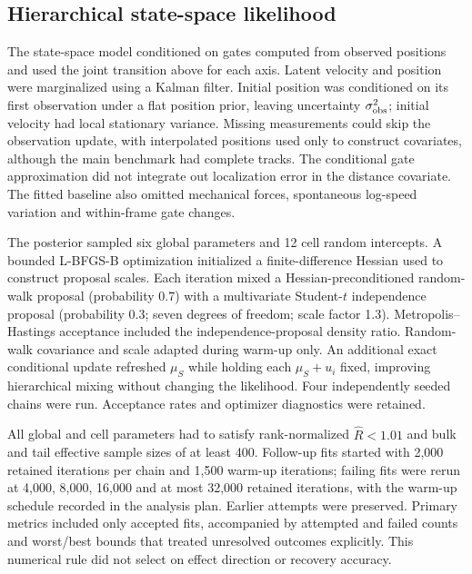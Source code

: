 \documentclass[12pt]{article}
\begin{document}
\subsection*{Hierarchical state-space likelihood}
The state-space model conditioned on gates computed from observed positions and used the joint transition above for each axis. Latent velocity and position were marginalized using a Kalman filter\citep{kalman1960}. Initial position was conditioned on its first observation under a flat position prior, leaving uncertainty $\sigma_{\rm obs}^2$; initial velocity had local stationary variance. Missing measurements could skip the observation update, with interpolated positions used only to construct covariates, although the main benchmark had complete tracks. The conditional gate approximation did not integrate out localization error in the distance covariate. The fitted baseline also omitted mechanical forces, spontaneous log-speed variation and within-frame gate changes.

The posterior sampled six global parameters and 12 cell random intercepts. A bounded L-BFGS-B optimization initialized a finite-difference Hessian used to construct proposal scales. Each iteration mixed a Hessian-preconditioned random-walk proposal (probability 0.7) with a multivariate Student-$t$ independence proposal (probability 0.3; seven degrees of freedom; scale factor 1.3). Metropolis--Hastings acceptance included the independence-proposal density ratio. Random-walk covariance and scale adapted during warm-up only. An additional exact conditional update refreshed $\mu_S$ while holding each $\mu_S+u_i$ fixed, improving hierarchical mixing without changing the likelihood. Four independently seeded chains were run. Acceptance rates and optimizer diagnostics were retained.

All global and cell parameters had to satisfy rank-normalized $\widehat R<1.01$ and bulk and tail effective sample sizes of at least 400\citep{vehtari2021}. Follow-up fits started with 2,000 retained iterations per chain and 1,500 warm-up iterations; failing fits were rerun at 4,000, 8,000, 16,000 and at most 32,000 retained iterations, with the warm-up schedule recorded in the analysis plan. Earlier attempts were preserved. Primary metrics included only accepted fits, accompanied by attempted and failed counts and worst/best bounds that treated unresolved outcomes explicitly. This numerical rule did not select on effect direction or recovery accuracy.
\end{document}

